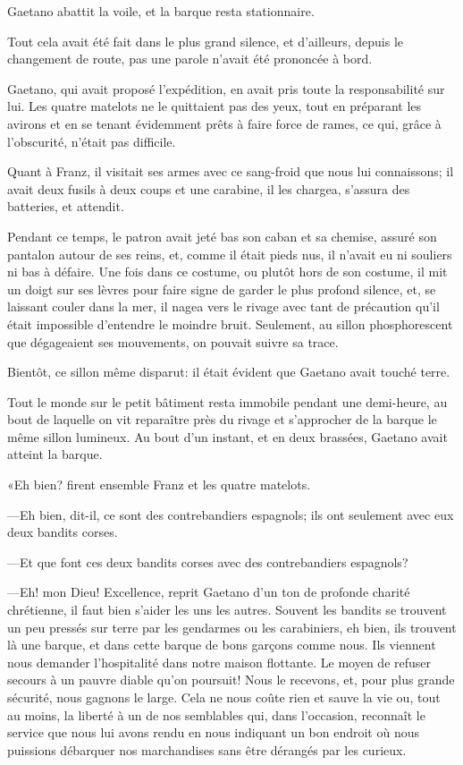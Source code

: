 Gaetano abattit la voile, et la barque resta stationnaire.

Tout cela avait été fait dans le plus grand silence, et d'ailleurs, depuis le changement de route, pas une parole n'avait été prononcée à bord.

Gaetano, qui avait proposé l'expédition, en avait pris toute la responsabilité sur lui. Les quatre matelots ne le quittaient pas des yeux, tout en préparant les avirons et en se tenant évidemment prêts à faire force de rames, ce qui, grâce à l'obscurité, n'était pas difficile.

Quant à Franz, il visitait ses armes avec ce sang-froid que nous lui connaissons; il avait deux fusils à deux coups et une carabine, il les chargea, s'assura des batteries, et attendit.

Pendant ce temps, le patron avait jeté bas son caban et sa chemise, assuré son pantalon autour de ses reins, et, comme il était pieds nus, il n'avait eu ni souliers ni bas à défaire. Une fois dans ce costume, ou plutôt hors de son costume, il mit un doigt sur ses lèvres pour faire signe de garder le plus profond silence, et, se laissant couler dans la mer, il nagea vers le rivage avec tant de précaution qu'il était impossible d'entendre le moindre bruit. Seulement, au sillon phosphorescent que dégageaient ses mouvements, on pouvait suivre sa trace.

Bientôt, ce sillon même disparut: il était évident que Gaetano avait touché terre.

Tout le monde sur le petit bâtiment resta immobile pendant une demi-heure, au bout de laquelle on vit reparaître près du rivage et s'approcher de la barque le même sillon lumineux. Au bout d'un instant, et en deux brassées, Gaetano avait atteint la barque.

«Eh bien? firent ensemble Franz et les quatre matelots.

—Eh bien, dit-il, ce sont des contrebandiers espagnols; ils ont seulement avec eux deux bandits corses.

—Et que font ces deux bandits corses avec des contrebandiers espagnols?

—Eh! mon Dieu! Excellence, reprit Gaetano d'un ton de profonde charité chrétienne, il faut bien s'aider les uns les autres. Souvent les bandits se trouvent un peu pressés sur terre par les gendarmes ou les carabiniers, eh bien, ils trouvent là une barque, et dans cette barque de bons garçons comme nous. Ils viennent nous demander l'hospitalité dans notre maison flottante. Le moyen de refuser secours à un pauvre diable qu'on poursuit! Nous le recevons, et, pour plus grande sécurité, nous gagnons le large. Cela ne nous coûte rien et sauve la vie ou, tout au moins, la liberté à un de nos semblables qui, dans l'occasion, reconnaît le service que nous lui avons rendu en nous indiquant un bon endroit où nous puissions débarquer nos marchandises sans être dérangés par les curieux.

